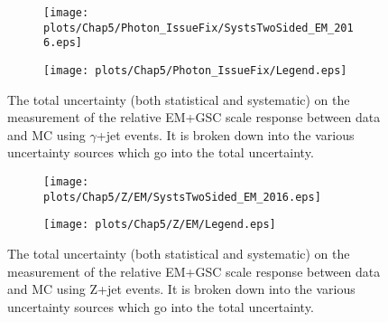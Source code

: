 \begin{figure}[!ht]
\captionsetup[subfigure]{labelformat=empty}
 \begin{center}
   \begin{subfigure}{0.55\textwidth}
     \hspace{-3cm}
     \texttt{[image: plots/Chap5/Photon\_IssueFix/SystsTwoSided\_EM\_2016.eps]}
   \end{subfigure}
   \begin{subfigure}{0.55\textwidth}
     \vspace{-0.2cm}
     \texttt{[image: plots/Chap5/Photon\_IssueFix/Legend.eps]}
   \end{subfigure} 
 \end{center}
 \caption[Uncertainty on the EM+GSC scale response measurement using $\gamma$+jet]
 {\small The total uncertainty (both statistical and systematic) on the measurement of the relative EM+GSC scale response between data and MC using $\gamma$+jet events.  It is broken down into the various uncertainty sources which go into the total uncertainty.  }
 \label{Fig:gJetSystsEM2016}
\end{figure}


\begin{figure}[!ht]
\captionsetup[subfigure]{labelformat=empty}
 \begin{center}
   \begin{subfigure}{0.55\textwidth}
     \hspace{-3cm}
     \texttt{[image: plots/Chap5/Z/EM/SystsTwoSided\_EM\_2016.eps]}
   \end{subfigure}
   \begin{subfigure}{0.55\textwidth}
     \vspace{-0.2cm}
     \texttt{[image: plots/Chap5/Z/EM/Legend.eps]}
   \end{subfigure}
 \end{center}
 \caption[Uncertainty on the EM+GSC scale response measurement using Z+jet]
 {\small The total uncertainty (both statistical and systematic) on the measurement of the relative EM+GSC scale response between data and MC using Z+jet events.  It is broken down into the various uncertainty sources which go into the total uncertainty.  }
 \label{Fig:ZJetSystsEM2016}
\end{figure}


